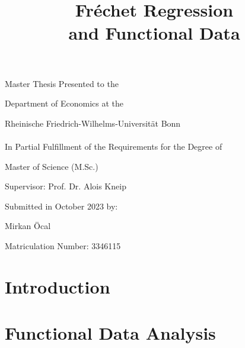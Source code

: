 \documentclass[12pt, a4paper, bibtotoc]{scrartcl}
\theoremstyle{break}
\begin{document}
\begin{titlepage}
    \title{
        Fréchet Regression \\
        and Functional Data
    }
    \vspace{\fill}
    \author{}
    \date{}
    \maketitle

    \vspace{\fill}
    \begin{center}
        \large
        Master Thesis Presented to the

        Department of Economics at the

        Rheinische Friedrich-Wilhelms-Universität Bonn \\
        \ \\

        In Partial Fulfillment of the Requirements for the Degree of

        Master of Science (M.Sc.)

        \vspace{\fill}
        Supervisor: Prof. Dr. Alois Kneip

        \vspace{\fill}
        Submitted in October 2023 by:

        Mirkan Öcal

        Matriculation Number: 3346115
    \end{center}

    \thispagestyle{empty}
\end{titlepage}


\newpage %
\tableofcontents    %
\newpage %
\listoffigures      %

\newpage
{}

\section{Introduction}
\label{sec:introduction}


\section{Functional Data Analysis}
\label{sec:fda}

\end{document}

